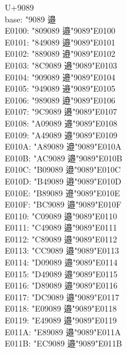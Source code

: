 \documentclass{ujarticle}
\begin{document}
\begin{multicols*}{4}
\newcolumn
U+9089\\
base: \kchar"9089 邉\\
E0100: \kchar"809089 邉󠄀\kchar"9089\kchar"E0100\\
E0101: \kchar"849089 邉󠄁\kchar"9089\kchar"E0101\\
E0102: \kchar"889089 邉󠄂\kchar"9089\kchar"E0102\\
E0103: \kchar"8C9089 邉󠄃\kchar"9089\kchar"E0103\\
E0104: \kchar"909089 邉󠄄\kchar"9089\kchar"E0104\\
E0105: \kchar"949089 邉󠄅\kchar"9089\kchar"E0105\\
E0106: \kchar"989089 邉󠄆\kchar"9089\kchar"E0106\\
E0107: \kchar"9C9089 邉󠄇\kchar"9089\kchar"E0107\\
E0108: \kchar"A09089 邉󠄈\kchar"9089\kchar"E0108\\
E0109: \kchar"A49089 邉󠄉\kchar"9089\kchar"E0109\\
E010A: \kchar"A89089 邉󠄊\kchar"9089\kchar"E010A\\
E010B: \kchar"AC9089 邉󠄋\kchar"9089\kchar"E010B\\
E010C: \kchar"B09089 邉󠄌\kchar"9089\kchar"E010C\\
E010D: \kchar"B49089 邉󠄍\kchar"9089\kchar"E010D\\
E010E: \kchar"B89089 邉󠄎\kchar"9089\kchar"E010E\\
E010F: \kchar"BC9089 邉󠄏\kchar"9089\kchar"E010F\\
E0110: \kchar"C09089 邉󠄐\kchar"9089\kchar"E0110\\
E0111: \kchar"C49089 邉󠄑\kchar"9089\kchar"E0111\\
E0112: \kchar"C89089 邉󠄒\kchar"9089\kchar"E0112\\
E0113: \kchar"CC9089 邉󠄓\kchar"9089\kchar"E0113\\
E0114: \kchar"D09089 邉󠄔\kchar"9089\kchar"E0114\\
E0115: \kchar"D49089 邉󠄕\kchar"9089\kchar"E0115\\
E0116: \kchar"D89089 邉󠄖\kchar"9089\kchar"E0116\\
E0117: \kchar"DC9089 邉󠄗\kchar"9089\kchar"E0117\\
E0118: \kchar"E09089 邉󠄘\kchar"9089\kchar"E0118\\
E0119: \kchar"E49089 邉󠄙\kchar"9089\kchar"E0119\\
E011A: \kchar"E89089 邉󠄚\kchar"9089\kchar"E011A\\
E011B: \kchar"EC9089 邉󠄛\kchar"9089\kchar"E011B\\

\end{multicols*}
\end{document}
